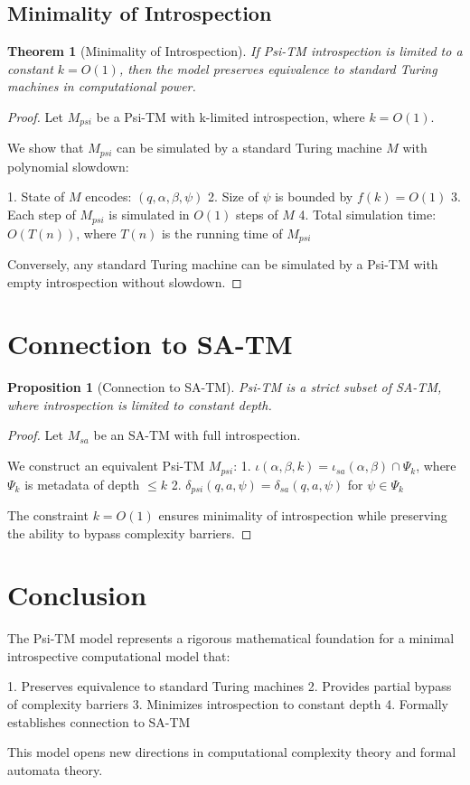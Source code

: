 \documentclass[11pt]{article}
\newtheorem{theorem}{Theorem}
\newtheorem{proposition}{Proposition}
\begin{document}
\subsection{Minimality of Introspection}

\begin{theorem}[Minimality of Introspection]
If Psi-TM introspection is limited to a constant $k = O(1)$, then the model preserves equivalence to standard Turing machines in computational power.
\end{theorem}

\begin{proof}
Let $M_{psi}$ be a Psi-TM with k-limited introspection, where $k = O(1)$.

We show that $M_{psi}$ can be simulated by a standard Turing machine $M$ with polynomial slowdown:

1. State of $M$ encodes: $(q, \alpha, \beta, \psi)$
2. Size of $\psi$ is bounded by $f(k) = O(1)$
3. Each step of $M_{psi}$ is simulated in $O(1)$ steps of $M$
4. Total simulation time: $O(T(n))$, where $T(n)$ is the running time of $M_{psi}$

Conversely, any standard Turing machine can be simulated by a Psi-TM with empty introspection without slowdown.
\end{proof}

\section{Connection to SA-TM}

\begin{proposition}[Connection to SA-TM]
Psi-TM is a strict subset of SA-TM, where introspection is limited to constant depth.
\end{proposition}

\begin{proof}
Let $M_{sa}$ be an SA-TM with full introspection.

We construct an equivalent Psi-TM $M_{psi}$:
1. $\iota(\alpha, \beta, k) = \iota_{sa}(\alpha, \beta) \cap \Psi_k$, where $\Psi_k$ is metadata of depth $\leq k$
2. $\delta_{psi}(q, a, \psi) = \delta_{sa}(q, a, \psi)$ for $\psi \in \Psi_k$

The constraint $k = O(1)$ ensures minimality of introspection while preserving the ability to bypass complexity barriers.
\end{proof}

\section{Conclusion}

The Psi-TM model represents a rigorous mathematical foundation for a minimal introspective computational model that:

1. Preserves equivalence to standard Turing machines
2. Provides partial bypass of complexity barriers
3. Minimizes introspection to constant depth
4. Formally establishes connection to SA-TM

This model opens new directions in computational complexity theory and formal automata theory.
\end{document}
